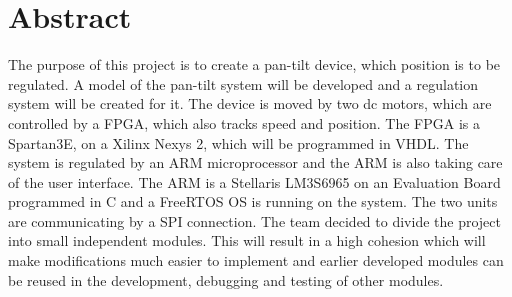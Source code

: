 \chapter*{Abstract}

The purpose of this project is to create a pan-tilt device, which position is to be regulated. A model of the pan-tilt system will be developed and a regulation system will be created for it. The device is moved by two dc motors, which are controlled by a FPGA, which also tracks speed and position. The FPGA is a Spartan3E, on a Xilinx Nexys 2, which will be programmed in VHDL. The system is regulated by an ARM microprocessor and the ARM is also taking care of the user interface. The ARM is a Stellaris LM3S6965 on an Evaluation Board programmed in C and a FreeRTOS OS is running on the system. The two units are communicating by a SPI connection. The team decided to divide the project into small independent modules. This will result in a high cohesion which will make modifications much easier to implement and earlier developed modules can be reused in the development, debugging and testing of other modules.